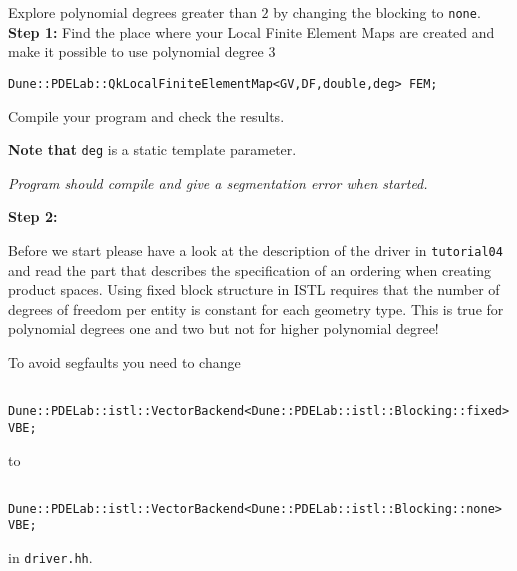 \documentclass[12pt,a4paper]{article}
\begin{document}
\begin{Exercise}{ Explore polynomial degrees greater than $2$ by changing the blocking
to \lstinline{none}. }
 \textbf{Step 1:}
Find the place where your Local Finite Element Maps are created and make it possible to use polynomial degree 3

\begin{lstlisting}
Dune::PDELab::QkLocalFiniteElementMap<GV,DF,double,deg> FEM;
\end{lstlisting}

Compile your program and check the results.

\textbf{Note that} \lstinline!deg! is a static template parameter.

\textit{Program should compile and give a segmentation error when started.}

 \textbf{Step 2:}

Before we start please have a look at the description of the driver in \lstinline!tutorial04! and read the part that describes the specification of an ordering when creating
product spaces. Using fixed block structure in ISTL requires that the number of degrees of freedom per entity is constant for each geometry type. This is true for polynomial degrees one and two but not for higher polynomial degree!

 To avoid segfaults you need to change

  \begin{lstlisting}
  Dune::PDELab::istl::VectorBackend<Dune::PDELab::istl::Blocking::fixed> VBE;  \end{lstlisting}
 to
\begin{lstlisting}
  Dune::PDELab::istl::VectorBackend<Dune::PDELab::istl::Blocking::none> VBE;  \end{lstlisting}
 in  \lstinline!driver.hh!.

\end{Exercise}
\end{document}
